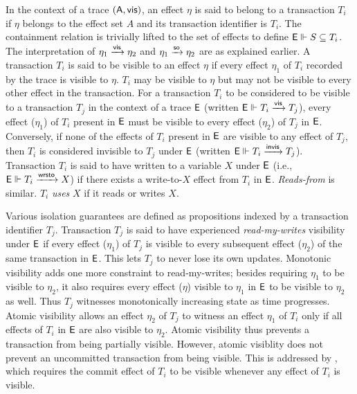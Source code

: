 In the context of a trace $(\textsf{A},\textsf{vis})$, an effect $\eta$ is said to
belong to a transaction $T_i$ if $\eta$ belongs to the effect set $A$
and its transaction identifier is $T_i$. The containment relation is
trivially lifted to the set of effects to define $\textsf{E} \Vdash S \subseteq
  T_i$.  The interpretation of $\eta_1 \xrightarrow{\textsf{vis}} \eta_2$ and $\eta_1
\xrightarrow{\textsf{so}} \eta_2$ are as explained earlier.  A transaction $T_i$ is said
to be visible to an effect $\eta$ if every effect $\eta_1$ of $T_i$
recorded by the trace is visible to $\eta$.  $T_i$ may be visible to
$\eta$ but may not be visible to every other effect in the
transaction. For a transaction $T_i$ to be considered to be visible to
a transaction $T_j$ in the context of a trace $\textsf{E}$ (written
$\textsf{E} \Vdash T_i \xrightarrow{\textsf{vis}} T_j$), every effect ($\eta_1$) of $T_i$ present
in $\textsf{E}$ must be visible to every effect ($\eta_2$) of $T_j$ in
$\textsf{E}$. Conversely, if none of the effects of $T_i$ present in $\textsf{E}$ are
visible to any effect of $T_j$, then $T_i$ is considered invisible to
$T_j$ under $\textsf{E}$ (written $\textsf{E} \Vdash T_i \xrightarrow{\textsf{invis}} T_j$). Transaction
$T_i$ is said to have written to a variable $X$ under $\textsf{E}$ (i.e.,
$\textsf{E} \Vdash T_i \xrightarrow{\textsf{wrsto}} X$) if there exists a write-to-$X$ effect from
$T_i$ in $\textsf{E}$. \emph{Reads-from} is similar. $T_i$ \emph{uses} $X$ if
it reads or writes $X$.

Various isolation guarantees are defined as propositions indexed by
a transaction identifier $T_j$. Transaction $T_j$ is said to have
experienced \emph{read-my-writes} visibility under $\textsf{E}$ if every
effect ($\eta_1$) of $T_j$ is visible to every subsequent effect
($\eta_2$) of the same transaction in $\textsf{E}$. This lets $T_j$ to never
lose its own updates. Monotonic visibility adds one more constraint to
read-my-writes; besides requiring $\eta_1$ to be visible to $\eta_2$,
it also requires every effect ($\eta$) visible to $\eta_1$ in $\textsf{E}$ to
be visible to $\eta_2$ as well. Thus $T_j$ witnesses monotonically
increasing state as time progresses. Atomic visibility allows an
effect $\eta_2$ of $T_j$ to witness an effect $\eta_1$ of $T_i$ only
if all effects of $T_i$ in $\textsf{E}$ are also visible to $\eta_2$. Atomic
visibility thus prevents a transaction from being partially visible.
However, atomic visiblity does not prevent an uncommitted
transaction from being visible. This is addressed by ,
which requires the commit effect of $T_i$ to be visible whenever any
effect of $T_i$ is visible.

